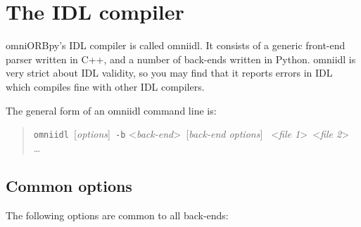 \documentclass[draft,11pt,twoside,a4paper]{book}
\newcommand{\cmdline}[1]{\texttt{#1}}
\begin{document}
\chapter{The IDL compiler}
\label{chap:omniidl}

omniORBpy's IDL compiler is called omniidl. It consists of a generic
front-end parser written in C++, and a number of back-ends written in
Python. omniidl is very strict about IDL validity, so you may find
that it reports errors in IDL which compiles fine with other IDL
compilers.

The general form of an omniidl command line is:

\begin{quote} %
\cmdline{omniidl }[\textit{options}]\cmdline{ -b}%
<\textit{back-end}>\cmdline{ }[\textit{back-end options}]%
\cmdline{ }<\textit{file 1}>\cmdline{ }<\textit{file 2}>%
\cmdline{ }\dots
\end{quote}

\section{Common options}

The following options are common to all back-ends:
\end{document}
